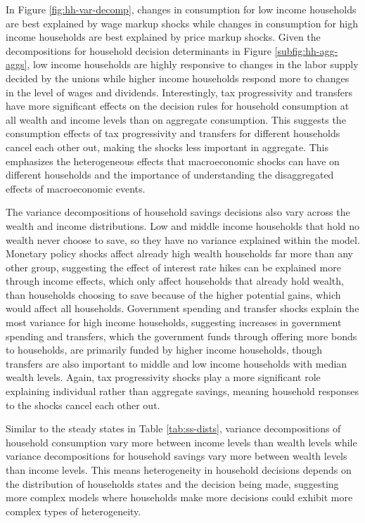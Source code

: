 In Figure \ref{fig:hh-var-decomp}, changes in consumption for low income households are best explained by wage markup shocks while changes in consumption for high income households are best explained by price markup shocks. Given the decompositions for household decision determinants in Figure \ref{subfig:hh-agg-aggs}, low income households are highly responsive to changes in the labor supply decided by the unions while higher income households respond more to changes in the level of wages and dividends. Interestingly, tax progressivity and transfers have more significant effects on the decision rules for household consumption at all wealth and income levels than on aggregate consumption. This suggests the consumption effects of tax progressivity and transfers for different households cancel each other out, making the shocks less important in aggregate. This emphasizes the heterogeneous effects that macroeconomic shocks can have on different households and the importance of understanding the disaggregated effects of macroeconomic events.

The variance decompositions of household savings decisions also vary across the wealth and income distributions. Low and middle income households that hold no wealth never choose to save, so they have no variance explained within the model. Monetary policy shocks affect already high wealth households far more than any other group, suggesting the effect of interest rate hikes can be explained more through income effects, which only affect households that already hold wealth, than households choosing to save because of the higher potential gains, which would affect all households. Government spending and transfer shocks explain the most variance for high income households, suggesting increases in government spending and transfers, which the government funds through offering more bonds to households, are primarily funded by higher income households, though transfers are also important to middle and low income households with median wealth levels. Again, tax progressivity shocks play a more significant role explaining individual rather than aggregate savings, meaning household responses to the shocks cancel each other out.

Similar to the steady states in Table \ref{tab:ss-dists}, variance decompositions of household consumption vary more between income levels than wealth levels while variance decompositions for household savings vary more between wealth levels than income levels. This means heterogeneity in household decisions depends on the distribution of households states and the decision being made, suggesting more complex models where households make more decisions could exhibit more complex types of heterogeneity.  
